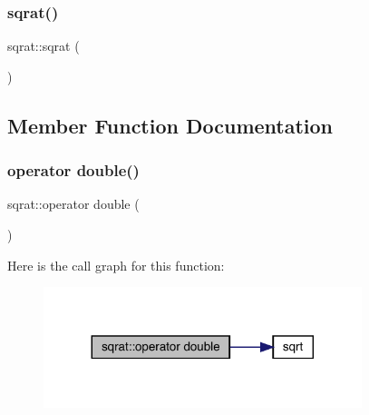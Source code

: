 \mbox{\label{classsqrat_a133ea2fa104facfe3057277d096235d2}} 
\subsubsection{\texorpdfstring{sqrat()}{sqrat()}\hspace{0.1cm}{\footnotesize\ttfamily [15/15]}}
{\footnotesize\ttfamily sqrat\+::sqrat (\begin{DoxyParamCaption}{ }\end{DoxyParamCaption})}



\subsection{Member Function Documentation}
\mbox{\label{classsqrat_af1d90ee59e36a87aa7a94dacdab875de}} 
\subsubsection{\texorpdfstring{operator double()}{operator double()}\hspace{0.1cm}{\footnotesize\ttfamily [1/3]}}
{\footnotesize\ttfamily sqrat\+::operator double (\begin{DoxyParamCaption}{ }\end{DoxyParamCaption})\hspace{0.3cm}{\ttfamily [explicit]}}

Here is the call graph for this function\+:
\nopagebreak
\begin{figure}[H]
\begin{center}
\leavevmode
\includegraphics[width=263pt]{df/d67/classsqrat_af1d90ee59e36a87aa7a94dacdab875de_cgraph}
\end{center}
\end{figure}
\mbox{\label{classsqrat_af1d90ee59e36a87aa7a94dacdab875de}} 
